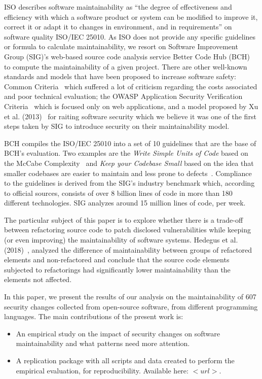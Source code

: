 \documentclass[10pt,conference]{IEEEtran}
\begin{document}
ISO describes software maintainability as ``the degree of effectiveness and
efficiency with which a software product or system can be modified to improve
it, correct it or adapt it to changes in environment, and in requirements'' on
software quality ISO/IEC 25010. As ISO does not provide any specific guidelines or
formula to calculate maintainability, we resort on Software Improvement
Group (SIG)'s web-based source code analysis service Better Code Hub
(BCH)~\cite{Visser:2016:OREILLY} to compute the maintainability of a given
project. There are other well-known standards and models that have been proposed to increase software safety: 
Common Criteria~\cite{common:2009} which suffered a lot of criticism regarding the
costs associated and poor technical evaluation; the OWASP 
Application Security Verification Criteria~\cite{oswap:2009} which is focused only
on web applications, and a model proposed by Xu et al. (2013)~\cite{6616351} for 
raiting software security which we believe it was one of the first steps taken
by SIG to introduce security on their maintainability model.

BCH compiles the ISO/IEC 25010 into a set of 10 guidelines that are the
base of BCH's evaluation. Two examples are the
\emph{Write Simple Units of Code} based on the McCabe Complexity~\cite{1702388}
and \emph{Keep your Codebase Small} based on the idea that smaller codebases are
easier to maintain and less prone to defects~\cite{Visser:2016:OREILLY}. Compliance to the guidelines is derived from the SIG's
industry benchmark which, according to official sources, consists of over 8
billion lines of code in more than 180 different technologies. SIG analyzes
around 15 million lines of code, per week.

The particular subject of this paper is to explore whether there is a trade-off
between refactoring source code to patch disclosed vulnerabilities while keeping
(or even improving) the maintainability of software systems. Hedegus et al. (2018)~\cite{HEGEDUS2018313}, 
analyzed the difference of maintainability between
groups of refactored elements and non-refactored and conclude that the source
code elements subjected to refactorings had significantly lower maintainability
than the elements not affected. 

In this paper, we present the results of our analysis on the maintainability of
607 security changes collected from open-source software, from different
programming languages. The main contributions of the present work is:
\begin{itemize}
	\item An empirical study on the impact of security changes on software
	maintainability and what patterns need more attention.

	\item A replication package with all scripts and data created to perform the
	empirical evaluation, for reproducibility. Available here: $<url>$.

\end{itemize}
\end{document}

